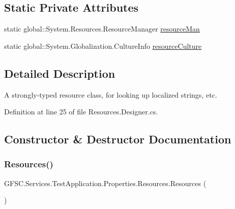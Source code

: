 \subsection*{Static Private Attributes}
\begin{DoxyCompactItemize}
\item 
static global\+::\+System.\+Resources.\+Resource\+Manager \mbox{\hyperlink{class_g_f_s_c_1_1_services_1_1_test_application_1_1_properties_1_1_resources_aa4f35563c27d369edc65fdea8e54b8b4}{resource\+Man}}
\item 
static global\+::\+System.\+Globalization.\+Culture\+Info \mbox{\hyperlink{class_g_f_s_c_1_1_services_1_1_test_application_1_1_properties_1_1_resources_a96e7463da9f2d6d013d2148c9d466934}{resource\+Culture}}
\end{DoxyCompactItemize}


\subsection{Detailed Description}
A strongly-\/typed resource class, for looking up localized strings, etc. 



Definition at line 25 of file Resources.\+Designer.\+cs.



\subsection{Constructor \& Destructor Documentation}
\mbox{\label{class_g_f_s_c_1_1_services_1_1_test_application_1_1_properties_1_1_resources_aced6ef11e2b6e77260c14cef830ce6d1}} 
\subsubsection{\texorpdfstring{Resources()}{Resources()}}
{\footnotesize\ttfamily G\+F\+S\+C.\+Services.\+Test\+Application.\+Properties.\+Resources.\+Resources (\begin{DoxyParamCaption}{ }\end{DoxyParamCaption})\hspace{0.3cm}{\ttfamily [package]}}



